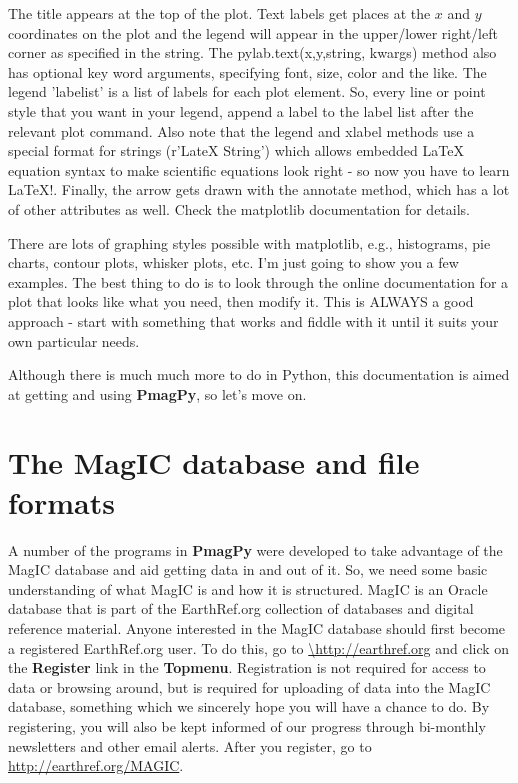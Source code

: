 \documentclass[11pt]{book}
\begin{document}
{{{The title appears at the top of the plot.  
    Text labels get places at the $x$ and $y$ coordinates on the plot and the legend will appear in the upper/lower right/left corner as specified in the string.  The {\color{blue}pylab.text(x,y,string, kwargs)} method also has optional key word arguments, specifying font, size, color and the like.     The legend 'labelist' is a list of labels for each plot element.  So, every line or point style that you want in your legend, append a label to the label list after the relevant plot command. Also note that the legend and xlabel methods use  a special format for strings ({\color{blue}r'LateX String')} which allows embedded LaTeX equation syntax  to make scientific equations look right - so now you have to learn LaTeX!.   Finally, the arrow gets drawn with the {\color{blue}annotate} method, which has a lot of other attributes as well.
Check the {\color{blue}matplotlib} documentation for details.  
    




There are lots of graphing styles possible with {\color{blue}matplotlib}, e.g., histograms, pie charts, contour plots, whisker plots, etc.  I'm just going to show you a few examples.  The best thing to do is to look through the online documentation for a plot that looks like what you need, then modify it.  This is ALWAYS a good approach - start with something that works and fiddle with it until it suits your own particular needs.  



Although there is much much more to do in Python, this documentation is aimed at getting and using {\bf PmagPy}, so let's move on.  



\chapter{The MagIC database and file formats}

A number of the programs in {\bf PmagPy} were  developed to take advantage of the MagIC database and aid getting data in and out of it.   So, we need some basic understanding of what MagIC is and how it is structured.  
MagIC  is an Oracle  database that is part of the EarthRef.org collection of databases and digital reference material.  
Anyone interested in the MagIC database should first become a registered EarthRef.org user.  To do this, go to \url{\http://earthref.org} and click on the {\bf Register} link in the {\bf Topmenu}.   Registration is not required for access to data or browsing around, but is required for uploading of data into the MagIC database, something which we sincerely hope you will have a chance to do.  By registering, you will also be kept informed of our progress through bi-monthly newsletters and other email alerts.    After you register, go to \url{http://earthref.org/MAGIC}.


}}}
\end{document}
